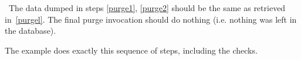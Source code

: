 \result\ The data dumped in steps \ref{purge1}, \ref{purge2} should be the
same as retrieved in~\ref{purgel}. The final purge invocation should
do nothing (i.e. nothing was left in the database).

\begin{hints}
The example  does exactly this sequence of steps,
including the checks.
\end{hints}
